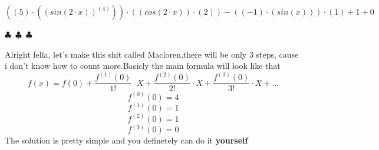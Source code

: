 \documentclass{article}
\begin{document}
\begin{center}$
{{{{{({{({5})}\cdot{({{({sin{({{2}\cdot{x}})}})}^{({4})}})}})}\cdot{({{({cos{({{2}\cdot{x}})}})}\cdot{({2})}})}}-{{({{({-1})}\cdot{({sin{({x})}})}})}\cdot{({1})}}}+{1}}+{0}}
$\end{center}
\begin{center} $\clubsuit$~$\clubsuit$~$\clubsuit$ \end{center}Alright fella, let's make this shit called Macloren,there will be only 3 steps, cause i don't know how to count more.Basicly the main formula will look like that
 \[ f(x) = f(0) + \frac{f^{(1)}(0)}{1!}\cdot X + \frac{f^{(2)}(0)}{2!}\cdot X + \frac{f^{(3)}(0)}{3!}\cdot X + \text{...}\]
\[ f^{(0)}(0) = 4\]\[ f^{(1)}(0) = 1\]\[ f^{(2)}(0) = 1\]\[ f^{(3)}(0) = 0\]
        The solution is pretty simple and you definetely can do it \textbf{yourself}
        
\end{document}
